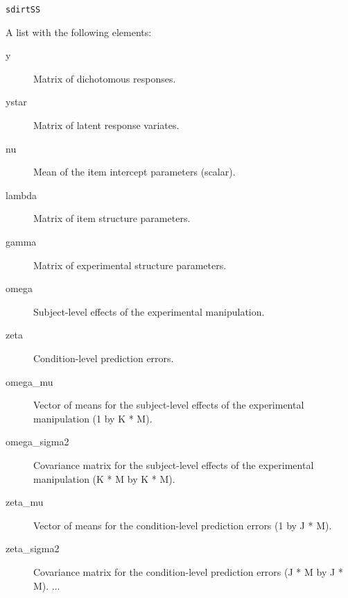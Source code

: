 \documentclass[a4paper]{book}
\begin{document}
%
\begin{Usage}
\begin{verbatim}
sdirtSS
\end{verbatim}
\end{Usage}
%
\begin{Format}
A list with the following elements:
\begin{description}

\item[y] Matrix of dichotomous responses.
\item[ystar] Matrix of latent response variates.
\item[nu] Mean of the item intercept parameters (scalar).
\item[lambda] Matrix of item structure parameters.
\item[gamma] Matrix of experimental structure parameters.
\item[omega] Subject-level effects of the experimental manipulation.
\item[zeta] Condition-level prediction errors.
\item[omega\_mu] Vector of means for the subject-level effects of the
experimental manipulation (1 by K * M).
\item[omega\_sigma2] Covariance matrix for the subject-level effects of the
experimental manipulation (K * M by K * M).
\item[zeta\_mu] Vector of means for the condition-level prediction errors
(1 by J * M).
\item[zeta\_sigma2] Covariance matrix for the condition-level prediction
errors (J * M by J * M).
...

\end{description}

\end{Format}
\printindex{}
\end{document}
